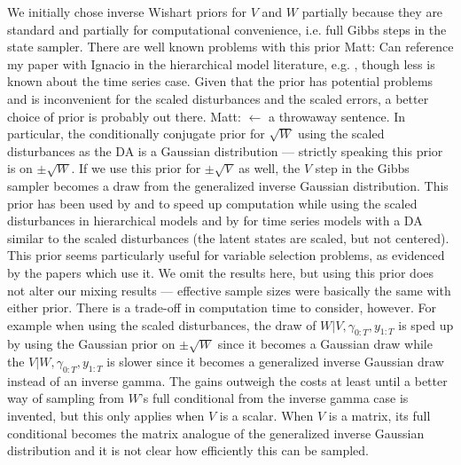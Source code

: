 \documentclass{article}
\newcommand{\matt}[1]{{\color{red} Matt: #1}}
\begin{document}
We initially chose inverse Wishart priors for $V$ and $W$ partially because they are standard and partially for computational convenience, i.e. full Gibbs steps in the state sampler. There are well known problems with this prior \matt{Can reference my paper with Ignacio} in the hierarchical model literature, e.g. \citet{gelman2006prior}, though less is known about the time series case. Given that the prior has potential problems and is inconvenient for the scaled disturbances and the scaled errors, a better choice of prior is probably out there. \matt{$\leftarrow$ a throwaway sentence.} In particular, the conditionally conjugate prior for $\sqrt{W}$ using the scaled disturbances as the DA is a Gaussian distribution --- strictly speaking this prior is on $\pm \sqrt{W}$. If we use this prior for $\pm\sqrt{V}$ as well, the $V$ step in the Gibbs sampler becomes a draw from the generalized inverse Gaussian distribution. This prior has been used by \citet{fruhwirth2011bayesian} and \citet{fruhwirth2008bayesian} to speed up computation while using the scaled disturbances in hierarchical models and by \citet{fruhwirth2010stochastic} for time series models with a DA similar to the scaled disturbances (the latent states are scaled, but not centered). This prior seems particularly useful for variable selection problems, as evidenced by the papers which use it. We omit the results here, but using this prior does not alter our mixing results --- effective sample sizes were basically the same with either prior. There is a trade-off in computation time to consider, however. For example when using the scaled disturbances, the draw of $W|V,\gamma_{0:T},y_{1:T}$ is sped up by using the Gaussian prior on $\pm\sqrt{W}$ since it becomes a Gaussian draw while the $V|W,\gamma_{0:T},y_{1:T}$ is slower since it becomes a generalized inverse Gaussian draw instead of an inverse gamma. The gains outweigh the costs at least until a better way of sampling from $W$'s full conditional from the inverse gamma case is invented, but this only applies when $V$ is a scalar. When $V$ is a matrix, its full conditional becomes the matrix analogue of the generalized inverse Gaussian distribution and it is not clear how efficiently this can be sampled.
\end{document}
